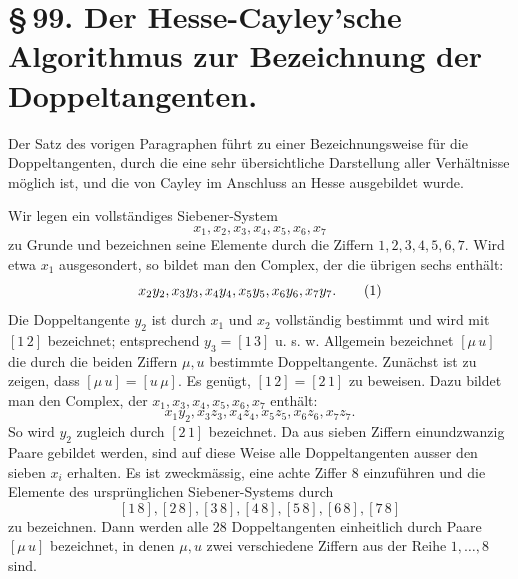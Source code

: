 \documentclass[11pt]{article}
\providecommand{\pair}[2]{[#1\,#2]}
\begin{document}
\section*{\S\,99. Der Hesse-Cayley'sche Algorithmus zur Bezeichnung der Doppeltangenten.}

Der Satz des vorigen Paragraphen führt zu einer Bezeichnungsweise für die Doppeltangenten, durch die eine sehr übersichtliche Darstellung aller Verhältnisse möglich ist, und die von Cayley im Anschluss an Hesse ausgebildet wurde.

Wir legen ein vollständiges Siebener-System
\[
 x_1,x_2,x_3,x_4,x_5,x_6,x_7
\]
zu Grunde und bezeichnen seine Elemente durch die Ziffern \(1,2,3,4,5,6,7\). Wird etwa \(x_1\) ausgesondert, so bildet man den Complex, der die übrigen sechs enthält:
\begin{equation}
 x_2y_2,\\ x_3y_3,\\ x_4y_4,\\ x_5y_5,\\ x_6y_6,\\ x_7y_7.
 \tag{1}
\end{equation}
Die Doppeltangente \(y_2\) ist durch \(x_1\) und \(x_2\) vollständig bestimmt und wird mit \(\pair{1}{2}\) bezeichnet; entsprechend \(y_3=\pair{1}{3}\) u. s. w. Allgemein bezeichnet \(\pair{\mu}{u}\) die durch die beiden Ziffern \(\mu,u\) bestimmte Doppeltangente. Zunächst ist zu zeigen, dass \(\pair{\mu}{u}=\pair{u}{\mu}\). Es genügt, \(\pair{1}{2}=\pair{2}{1}\) zu beweisen. Dazu bildet man den Complex, der \(x_1,x_3,x_4,x_5,x_6,x_7\) enthält:
\begin{equation}
 x_1y_2,
 x_3z_3,
 x_4z_4,
 x_5z_5,
 x_6z_6,
 x_7z_7.
 \tag{2}
\end{equation}
So wird \(y_2\) zugleich durch \(\pair{2}{1}\) bezeichnet. Da aus sieben Ziffern einundzwanzig Paare gebildet werden, sind auf diese Weise alle Doppeltangenten ausser den sieben \(x_i\) erhalten. Es ist zweckmässig, eine achte Ziffer 8 einzuführen und die Elemente des ursprünglichen Siebener-Systems durch
\[
 \pair{1}{8},\pair{2}{8},\pair{3}{8},\pair{4}{8},\pair{5}{8},\pair{6}{8},\pair{7}{8}
\]
zu bezeichnen. Dann werden alle 28 Doppeltangenten einheitlich durch Paare \(\pair{\mu}{u}\) bezeichnet, in denen \(\mu,u\) zwei verschiedene Ziffern aus der Reihe \(1,
\ldots,8\) sind.
\end{document}

